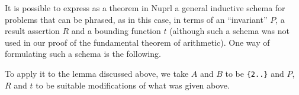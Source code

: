 It is possible to express as a theorem in Nuprl a general inductive schema
for problems that can be phrased, as in this case, in terms of an
``invariant'' $P$, a result assertion $R$ and a bounding function $t$
(although such a schema was not used in our proof of the fundamental theorem of
arithmetic).  One way of formulating such a schema is the
following.
\begin{Numath}
\end{Numath}%
To apply it to the lemma discussed above, we take $A$ and $B$ to be 
{\tt \{2..\}} and $P$, $R$ and $t$ to be suitable modifications of what was
given above. 

